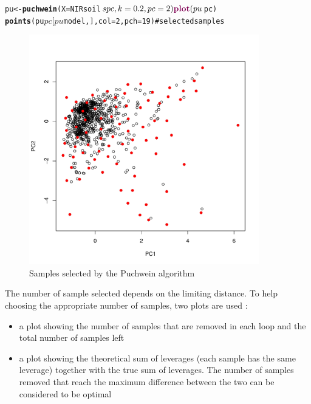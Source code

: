 \documentclass[12pt]{article}\usepackage{graphicx, color}
\makeatletter
\newcommand{\hlfunctioncall}[1]{\textcolor[rgb]{0.501960784313725,0,0.329411764705882}{\textbf{#1}}}%
\newcommand{\hlcomment}[1]{\textcolor[rgb]{0.180392156862745,0.6,0.341176470588235}{#1}}%
\newenvironment{kframe}{%
 \def\at@end@of@kframe{}%
 \ifinner\ifhmode%
  \def\at@end@of@kframe{\end{minipage}}%
  \begin{minipage}{\columnwidth}%
 \fi\fi%
 \def\FrameCommand##1{\hskip\@totalleftmargin \hskip-\fboxsep
 \colorbox{shadecolor}{##1}\hskip-\fboxsep
     \hskip-\linewidth \hskip-\@totalleftmargin \hskip\columnwidth}%
 \MakeFramed {\advance\hsize-\width
   \@totalleftmargin\z@ \linewidth\hsize
   \@setminipage}}%
 {\par\unskip\endMakeFramed%
 \at@end@of@kframe}
\newenvironment{knitrout}{}{} %
\makeatother
\begin{document}
\begin{knitrout}
\color{fgcolor}\begin{kframe}
\begin{alltt}
pu <- \hlfunctioncall{puchwein}(X = NIRsoil$spc, k = 0.2, pc = 2)
\hlfunctioncall{plot}(pu$pc)
\hlfunctioncall{points}(pu$pc[pu$model, ], col = 2, pch = 19)  \hlcomment{# selected samples}
\end{alltt}
\end{kframe}\begin{figure}[]


{\centering \includegraphics[width=10cm,height=10cm]{figure/puchwein} 

}

\caption[Samples selected by the Puchwein algorithm]{Samples selected by the Puchwein algorithm\label{fig:puchwein}}
\end{figure}


\end{knitrout}


The number of sample selected depends on the limiting distance. To help choosing the appropriate number of samples, two plots are used \cite{shetty2012}:
\begin{itemize}
  \item a plot showing the number of samples that are removed in each loop and the total number of samples left
  \item a plot showing the theoretical sum of leverages (each sample has the same leverage) together with the true sum of leverages. The number of samples removed that reach the maximum difference between the two can be considered to be optimal
\end{itemize}
\end{document}
